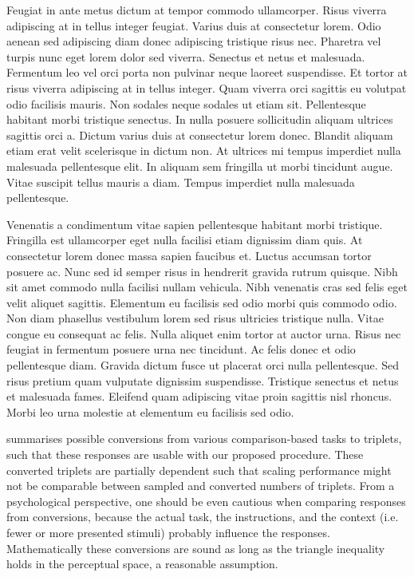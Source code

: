 Feugiat in ante metus dictum at tempor commodo ullamcorper. Risus viverra adipiscing at in tellus integer feugiat. Varius duis at consectetur lorem. Odio aenean sed adipiscing diam donec adipiscing tristique risus nec. Pharetra vel turpis nunc eget lorem dolor sed viverra. Senectus et netus et malesuada. Fermentum leo vel orci porta non pulvinar neque laoreet suspendisse. Et tortor at risus viverra adipiscing at in tellus integer. Quam viverra orci sagittis eu volutpat odio facilisis mauris. Non sodales neque sodales ut etiam sit. Pellentesque habitant morbi tristique senectus. In nulla posuere sollicitudin aliquam ultrices sagittis orci a. Dictum varius duis at consectetur lorem donec. Blandit aliquam etiam erat velit scelerisque in dictum non. At ultrices mi tempus imperdiet nulla malesuada pellentesque elit. In aliquam sem fringilla ut morbi tincidunt augue. Vitae suscipit tellus mauris a diam. Tempus imperdiet nulla malesuada pellentesque.

Venenatis a condimentum vitae sapien pellentesque habitant morbi tristique. Fringilla est ullamcorper eget nulla facilisi etiam dignissim diam quis. At consectetur lorem donec massa sapien faucibus et. Luctus accumsan tortor posuere ac. Nunc sed id semper risus in hendrerit gravida rutrum quisque. Nibh sit amet commodo nulla facilisi nullam vehicula. Nibh venenatis cras sed felis eget velit aliquet sagittis. Elementum eu facilisis sed odio morbi quis commodo odio. Non diam phasellus vestibulum lorem sed risus ultricies tristique nulla. Vitae congue eu consequat ac felis. Nulla aliquet enim tortor at auctor urna. Risus nec feugiat in fermentum posuere urna nec tincidunt. Ac felis donec et odio pellentesque diam. Gravida dictum fusce ut placerat orci nulla pellentesque. Sed risus pretium quam vulputate dignissim suspendisse. Tristique senectus et netus et malesuada fames. Eleifend quam adipiscing vitae proin sagittis nisl rhoncus. Morbi leo urna molestie at elementum eu facilisis sed odio.


summarises possible conversions from various comparison-based tasks to triplets, such that these responses are usable with our proposed procedure.
These converted triplets are partially dependent such that scaling performance might not be comparable between sampled and converted numbers of triplets.  
From a psychological perspective, one should be even cautious when comparing responses from conversions, 
because the actual task, the instructions, and the context (i.e. fewer or more presented stimuli) probably influence the responses.
Mathematically these conversions are sound as long as the triangle inequality holds in the perceptual space, a reasonable assumption.

